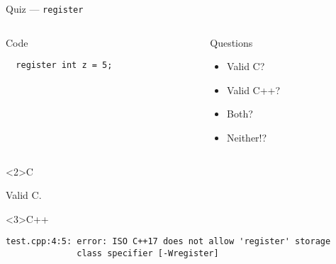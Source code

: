 \documentclass[presentation,aspectratio=169]{beamer}
\begin{document}
\begin{frame}[fragile,label={sec:org23c4234}]{Quiz — \texttt{register}}
 \begin{columns}
\begin{column}{0.48\columnwidth}
\begin{block}{Code}
\begin{verbatim}
  register int z = 5;
\end{verbatim}
\end{block}
\end{column}

\begin{column}{0.48\columnwidth}
\begin{block}{Questions}
\begin{itemize}
\item Valid C?
\item Valid C++?
\item Both?
\item Neither!?
\end{itemize}
\end{block}
\end{column}
\end{columns}

\begin{block}<2>{C}

Valid C.

\end{block}
\vspace{-1cm}
\begin{block}<3>{C++}
\begin{verbatim}
test.cpp:4:5: error: ISO C++17 does not allow 'register' storage
              class specifier [-Wregister]
\end{verbatim}
\end{block}
\end{frame}

\end{document}

